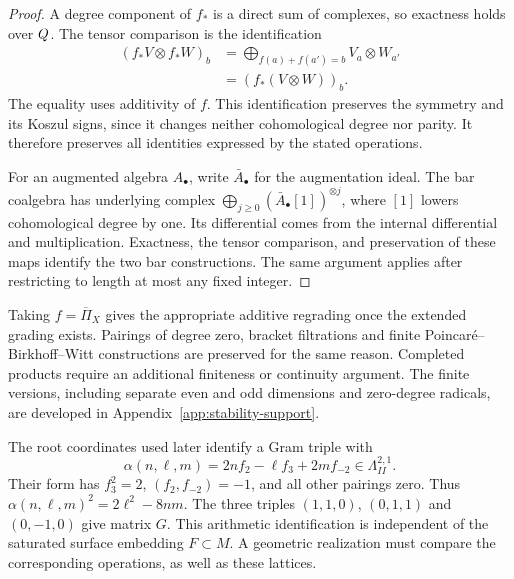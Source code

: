 \begin{proof}
A degree component of $f_*$ is a direct sum of complexes, so exactness
holds over $Q$.  The tensor comparison is the identification
\[
\begin{split}
(f_*V\otimes f_*W)_b
&=\bigoplus_{f(a)+f(a')=b}V_a\otimes W_{a'}\\
&=(f_*(V\otimes W))_b.
\end{split}
\]
The equality uses additivity of $f$.  This identification preserves
the symmetry and its Koszul signs, since it changes neither
cohomological degree nor parity.  It therefore preserves all
identities expressed by the stated operations.

For an augmented algebra $A_\bullet$, write $\bar A_\bullet$ for the
augmentation ideal.  The bar coalgebra has underlying complex
$\bigoplus_{j\ge0}(\bar A_\bullet[1])^{\otimes j}$, where $[1]$
lowers cohomological degree by one.  Its differential comes from the
internal differential and multiplication.  Exactness, the tensor
comparison, and preservation of these maps identify the two bar
constructions.  The same argument applies after restricting to
length at most any fixed integer.
\end{proof}

Taking $f=\overline\Pi_X$ gives the appropriate additive regrading
once the extended grading exists.  Pairings of degree zero, bracket
filtrations and finite Poincar\'e--Birkhoff--Witt constructions are
preserved for the same reason.  Completed products require an
additional finiteness or continuity argument.  The finite versions,
including separate even and odd dimensions and zero-degree radicals,
are developed in Appendix~\ref{app:stability-support}.

\begin{remark}
\label{rem:normal-ordered-recognition-target}
The root coordinates used later identify a Gram triple with
\[
\alpha(n,\ell,m)=2nf_2-\ell f_3+2mf_{-2}
\in\Lambda_{II}^{2,1}.
\]
Their form has $f_3^2=2$, $(f_2,f_{-2})=-1$, and all other pairings
zero.  Thus $\alpha(n,\ell,m)^2=2\ell^2-8nm$.
The three triples $(1,1,0)$, $(0,1,1)$ and $(0,-1,0)$ give matrix
$G$.  This arithmetic identification is independent of the saturated
surface embedding $F\subset M$.  A geometric realization must
compare the corresponding operations, as well as these lattices.
\end{remark}

